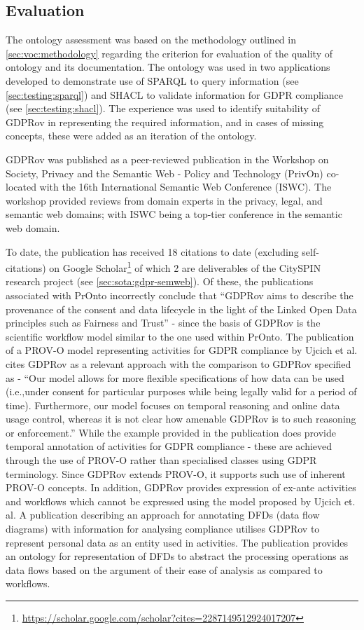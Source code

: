 \subsection{Evaluation}
The ontology assessment was based on the methodology outlined in \autoref{sec:voc:methodology} regarding the criterion for evaluation of the quality of ontology and its documentation.
The ontology was used in two applications developed to demonstrate use of SPARQL to query information (see \autoref{sec:testing:sparql}) and SHACL to validate information for GDPR compliance (see \autoref{sec:testing:shacl}). The experience was used to identify suitability of GDPRov in representing the required information, and in cases of missing concepts, these were added as an iteration of the ontology.

GDPRov was published \cite{pandit_modelling_2017} as a peer-reviewed publication in the Workshop on Society, Privacy and the Semantic Web - Policy and Technology (PrivOn) co-located with the 16th International Semantic Web Conference (ISWC). The workshop provided reviews from domain experts in the privacy, legal, and semantic web domains; with ISWC being a top-tier conference in the semantic web domain.

To date, the publication has received 18 citations to date (excluding self-citations) on Google Scholar\footnote{\url{https://scholar.google.com/scholar?cites=2287149512924017207}} of which 2 are deliverables of the CitySPIN research project (see \autoref{sec:sota:gdpr-semweb}).
Of these, the publications associated with PrOnto \cite{palmirani_pronto_2018,palmirani_pronto_2018-1} incorrectly conclude that ``GDPRov aims to describe the provenance of the consent and data lifecycle in the light of the Linked Open Data principles such as Fairness and Trust'' - since the basis of GDPRov is the scientific workflow model similar to the one used within PrOnto.
The publication of a PROV-O model representing activities for GDPR compliance by Ujcich et al. \cite{belhajjame_provenance_2018} cites GDPRov as a relevant approach with the comparison to GDPRov specified as - ``Our model allows for more flexible specifications of how data can be used (i.e.,under consent for particular purposes while being legally valid for a period of time). Furthermore, our model focuses on temporal reasoning and online data usage control, whereas it is not clear how amenable GDPRov is to such reasoning or enforcement.'' While the example provided in the publication does provide temporal annotation of activities for GDPR compliance - these are achieved through the use of PROV-O rather than specialised classes using GDPR terminology. Since GDPRov extends PROV-O, it supports such use of inherent PROV-O concepts. In addition, GDPRov provides expression of ex-ante activities and workflows which cannot be expressed using the model proposed by Ujcich et. al.
A publication describing an approach for annotating DFDs (data flow diagrams) with information for analysing compliance \cite{debruyneOntologyRepresentingAnnotating2019}  utilises GDPRov to represent personal data as an entity used in activities. The publication provides an ontology for representation of DFDs to abstract the processing operations as data flows based on the argument of their ease of analysis as compared to workflows.

